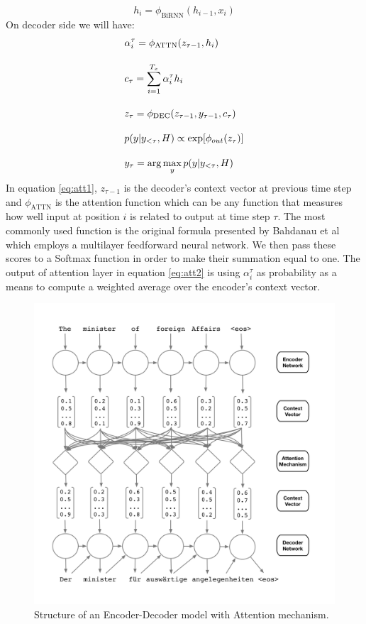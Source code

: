\documentclass{sfuthesis}
\begin{document}
$$h_i = \phi_{\text{BiRNN}}(h_{i-1}, x_i)$$
On decoder side we will have:
\begin{align}
\centering
&\alpha_i^\tau = \phi_{\text{ATTN}}(z_{\tau -1}, h_i)  \label{eq:att1} \\[1em]
&c_\tau = \sum_{i=1}^{T_x} \alpha_i^\tau h_i  \label{eq:att2} \\[1em]
&z_\tau = \phi_{\text{DEC}}(z_{\tau -1}, y_{\tau -1}, c_\tau)  \label{eq:att3} \\[1em]
&p(y|y_{<\tau}, H) \propto \text{exp} [\phi_{out} (z_{\tau}) ]  \label{eq:att4} \\[1em]
&y_{\tau} = \arg \max_y p(y|y_{<\tau}, H)
\end{align}
In equation \ref{eq:att1}, $z_{\tau - 1}$ is the decoder's context vector at previous time step and $\phi_{\text{ATTN}}$ is the attention function which can be any function that measures how well input at position $i$ is related to output at time step $\tau$. The most commonly used function is the original formula presented by Bahdanau et al \cite{Bahdanau:2014:Attention} which employs a multilayer feedforward neural network. We then pass these scores to a Softmax function in order to make their summation equal to one. The output of attention layer in equation \ref{eq:att2} is using $\alpha_i^\tau$ as probability as a means to compute a weighted average over the encoder's context vector.


\begin{figure}[t]
\centering
\includegraphics[scale=0.15]{./images/attention}
\caption{Structure of an Encoder-Decoder model with Attention mechanism.}
\label{fig:EncDec0}
\end{figure}
\end{document}
